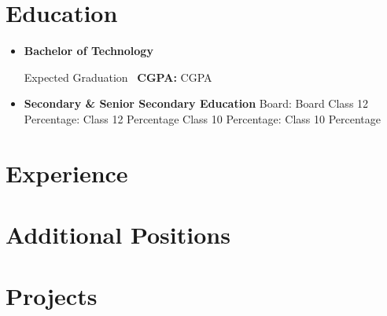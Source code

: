 \documentclass[10pt, letterpaper]{article}
\begin{document}
\section*{Education}

\begin{itemize}
\item \textbf{Bachelor of Technology} \

\hfill Expected Graduation \
\textbf{CGPA:} CGPA
\item \textbf{Secondary \& Senior Secondary Education} Board: Board Class 12 Percentage: Class 12 Percentage Class 10 Percentage: Class 10 Percentage 
\end{itemize}


\section*{Experience}
\begin{itemize}
\setlength{\itemsep}{0pt}
\end{itemize}
\section*{Additional Positions}
\begin{itemize}
\setlength{\itemsep}{0pt}
\end{itemize}


\section*{Projects}
\end{document}
